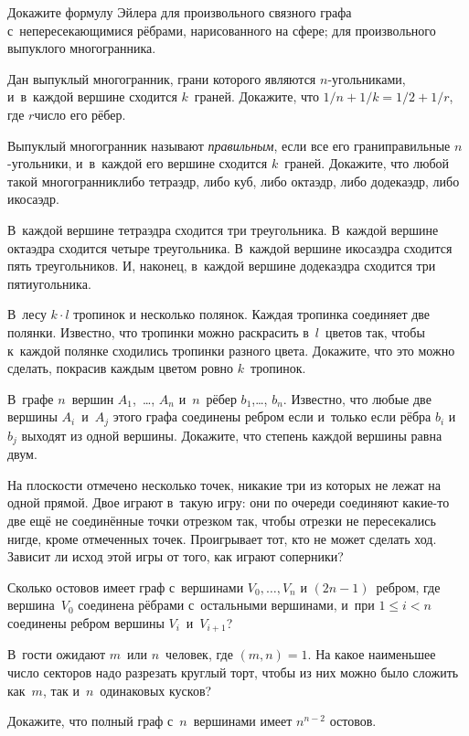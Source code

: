 \documentclass[a4paper,12pt]{article}
\begin{document}
Докажите формулу Эйлера
для произвольного связного графа с~непересекающимися рёбрами, нарисованного на сфере;
для произвольного выпуклого многогранника.

Дан выпуклый многогранник, грани которого являются $n$-угольниками, и~в~каждой вершине сходится $k$~граней. Докажите, что $1/n+1/k=1/2+1/r$, где $r$\т число его рёбер.

Выпуклый многогранник называют \emph{правильным}, если все его грани\т правильные $n$-угольники, и~в~каждой его вершине сходится $k$~граней. Докажите, что любой такой многогранник\т либо тетраэдр, либо куб, либо октаэдр, либо додекаэдр, либо икосаэдр.

В~каждой вершине тетраэдра сходится три треугольника. В~каждой вершине октаэдра сходится четыре треугольника. В~каждой вершине икосаэдра сходится пять треугольников. И, наконец, в~каждой вершине додекаэдра сходится три пятиугольника.

В~лесу $k\cdot l$ тропинок и несколько полянок. Каждая тропинка соединяет две полянки. Известно, что
тропинки можно раскрасить в~$l$~цветов так, чтобы к~каждой полянке сходились тропинки разного цвета. Докажите, что это можно сделать, покрасив каждым цветом ровно $k$~тропинок.

В~графе $n$~вершин $A_1$,~\dots, $A_n$ и~$n$~рёбер $b_1$,\dots, $b_n$. Известно, что любые две вершины $A_i$~и~$A_j$ этого графа соединены ребром если и~только если рёбра $b_i$ и $b_j$ выходят из одной
вершины. Докажите, что степень каждой вершины равна двум.

На плоскости отмечено несколько точек, никакие три из которых не лежат на одной прямой. Двое играют в~такую игру: они по очереди соединяют какие-то две ещё не соединённые точки отрезком так, чтобы отрезки не пересекались нигде, кроме отмеченных точек. Проигрывает тот, кто не может сделать ход.
Зависит ли исход этой игры от того, как играют соперники?

Сколько остовов имеет граф с~вершинами $V_0,\ldots,V_n$ и $(2n-1)$~ребром, где
вершина~$V_0$ соединена рёбрами с~остальными вершинами, и~при $1\leq i<n$ соединены ребром
вершины $V_i$~и~$V_{i+1}$?

В~гости ожидают $m$~или $n$~человек, где $(m,n)=1$. На какое наименьшее число секторов надо разрезать круглый торт, чтобы из них можно было сложить как~$m$, так и~$n$~одинаковых кусков?

Докажите, что полный граф с~$n$~вершинами имеет $n^{n-2}$ остовов.

{}
\end{document}
